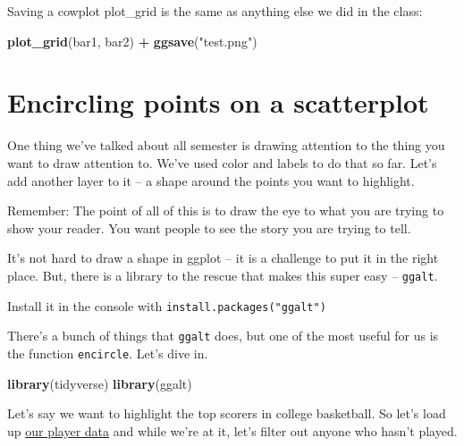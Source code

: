 \documentclass[
]{book}
\newenvironment{Shaded}{\begin{snugshade}}{\end{snugshade}}
\newcommand{\DecValTok}[1]{\textcolor[rgb]{0.00,0.00,0.81}{#1}}
\newcommand{\KeywordTok}[1]{\textcolor[rgb]{0.13,0.29,0.53}{\textbf{#1}}}
\newcommand{\NormalTok}[1]{#1}
\newcommand{\OperatorTok}[1]{\textcolor[rgb]{0.81,0.36,0.00}{\textbf{#1}}}
\newcommand{\StringTok}[1]{\textcolor[rgb]{0.31,0.60,0.02}{#1}}
\begin{document}
Saving a cowplot plot\_grid is the same as anything else we did in the class:

\begin{Shaded}
\begin{Highlighting}[]
\KeywordTok{plot_grid}\NormalTok{(bar1, bar2) }\OperatorTok{+}\StringTok{ }\KeywordTok{ggsave}\NormalTok{(}\StringTok{"test.png"}\NormalTok{)}
\end{Highlighting}
\end{Shaded}

\hypertarget{encircling-points-on-a-scatterplot}{%
\chapter{Encircling points on a scatterplot}\label{encircling-points-on-a-scatterplot}}

One thing we've talked about all semester is drawing attention to the thing you want to draw attention to. We've used color and labels to do that so far. Let's add another layer to it -- a shape around the points you want to highlight.

Remember: The point of all of this is to draw the eye to what you are trying to show your reader. You want people to see the story you are trying to tell.

It's not hard to draw a shape in ggplot -- it is a challenge to put it in the right place. But, there is a library to the rescue that makes this super easy -- \texttt{ggalt}.

Install it in the console with \texttt{install.packages("ggalt")}

There's a bunch of things that \texttt{ggalt} does, but one of the most useful for us is the function \texttt{encircle}. Let's dive in.

\begin{Shaded}
\begin{Highlighting}[]
\KeywordTok{library}\NormalTok{(tidyverse)}
\KeywordTok{library}\NormalTok{(ggalt)}
\end{Highlighting}
\end{Shaded}

Let's say we want to highlight the top scorers in college basketball. So let's load up \href{https://unl.box.com/s/0g56ve61y6hakyxzr1u4t534721bqvg8}{our player data} and while we're at it, let's filter out anyone who hasn't played.

\begin{Shaded}
\end{Shaded}
\end{document}
